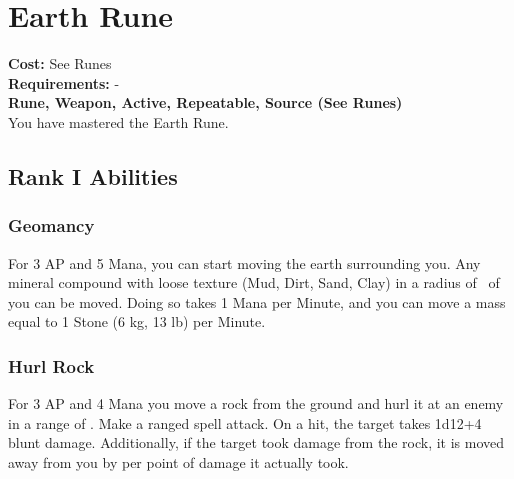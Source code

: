 \section{Earth Rune}\label{rune:earth}
\textbf{Cost:} See Runes\\
\textbf{Requirements:} -\\
\textbf{Rune, Weapon, Active, Repeatable, Source (See Runes)}\\
You have mastered the Earth Rune.

\subsection{Rank I Abilities}

\subsubsection{Geomancy}
For 3 AP and 5 Mana, you can start moving the earth surrounding you.
Any mineral compound with loose texture (Mud, Dirt, Sand, Clay) in a radius of~ of you can be moved.
Doing so takes 1 Mana per Minute, and you can move a mass equal to 1 Stone (6 kg, 13 lb) per Minute.

\subsubsection{Hurl Rock}
For 3 AP and 4 Mana you move a rock from the ground and hurl it at an enemy in a range of .
Make a ranged spell attack.
On a hit, the target takes 1d12+4 blunt damage.
Additionally, if the target took damage from the rock, it is moved away from you by  per point of damage it actually took.